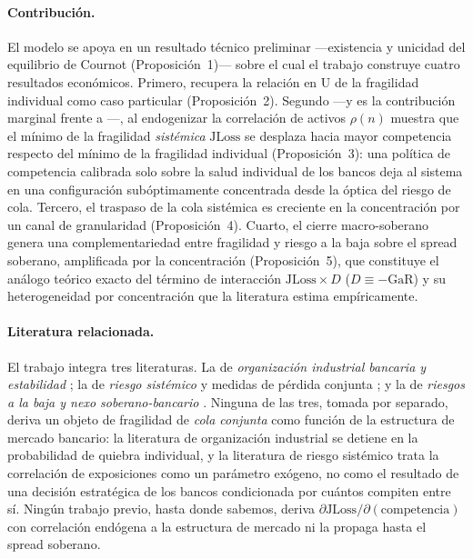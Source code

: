 \documentclass[11pt]{article}
\theoremstyle{plain}
\theoremstyle{definition}
\theoremstyle{remark}
\newcommand{\JLoss}{\mathrm{JLoss}}
\newcommand{\GaR}{\mathrm{GaR}}
\newcommand{\1}{\mathbf{1}}
\begin{document}
\paragraph{Contribución.} El modelo se apoya en un resultado técnico preliminar —existencia y unicidad del equilibrio de Cournot (Proposición~1)— sobre el cual el trabajo construye cuatro resultados económicos. Primero, recupera la relación en U de la fragilidad individual como caso particular (Proposición~2). Segundo ---y es la contribución marginal frente a \citet{MMR2010}---, al endogenizar la correlación de activos $\rho(n)$ muestra que el mínimo de la fragilidad \textit{sistémica} $\JLoss$ se desplaza hacia mayor competencia respecto del mínimo de la fragilidad individual (Proposición~3): una política de competencia calibrada solo sobre la salud individual de los bancos deja al sistema en una configuración subóptimamente concentrada desde la óptica del riesgo de cola. Tercero, el traspaso de la cola sistémica es creciente en la concentración por un canal de granularidad (Proposición~4). Cuarto, el cierre macro-soberano genera una complementariedad entre fragilidad y riesgo a la baja sobre el spread soberano, amplificada por la concentración (Proposición~5), que constituye el análogo teórico exacto del término de interacción $\JLoss\times D$ ($D\equiv-\GaR$) y su heterogeneidad por concentración que la literatura estima empíricamente.

\paragraph{Literatura relacionada.} El trabajo integra tres literaturas. La de \textit{organización industrial bancaria y estabilidad} \citep{Keeley1990,AllenGale2004,BoydDeNicolo2005,MMR2010,Vives2016}; la de \textit{riesgo sistémico} y medidas de pérdida conjunta \citep{Merton1974,Vasicek2002,Gordy2003,AcharyaEtAl2017,AdrianBrunnermeier2016}; y la de \textit{riesgos a la baja y nexo soberano-bancario} \citep{ABG2019,AcharyaDrechslerSchnabl2014,FarhiTirole2018,GhoshEtAl2013}. Ninguna de las tres, tomada por separado, deriva un objeto de fragilidad de \textit{cola conjunta} como función de la estructura de mercado bancario: la literatura de organización industrial se detiene en la probabilidad de quiebra individual, y la literatura de riesgo sistémico trata la correlación de exposiciones como un parámetro exógeno, no como el resultado de una decisión estratégica de los bancos condicionada por cuántos compiten entre sí. Ningún trabajo previo, hasta donde sabemos, deriva $\partial \JLoss/\partial(\text{competencia})$ con correlación endógena a la estructura de mercado ni la propaga hasta el spread soberano.
\end{document}

